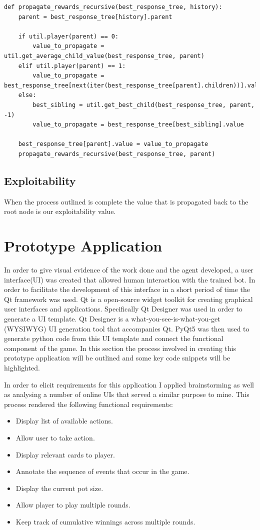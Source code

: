 \begin{lstlisting}[style=Python]
def propagate_rewards_recursive(best_response_tree, history):
    parent = best_response_tree[history].parent

    if util.player(parent) == 0:
        value_to_propagate = util.get_average_child_value(best_response_tree, parent)
    elif util.player(parent) == 1:
        value_to_propagate = best_response_tree[next(iter(best_response_tree[parent].children))].value
    else:
        best_sibling = util.get_best_child(best_response_tree, parent, -1)
        value_to_propagate = best_response_tree[best_sibling].value

    best_response_tree[parent].value = value_to_propagate
    propagate_rewards_recursive(best_response_tree, parent)
\end{lstlisting}

\subsection{Exploitability}\label{subsec:exploitability}
When the process outlined is complete the value that is propagated back to the
root node is our exploitability value.

\section{Prototype Application}\label{sec:prototypeApp}
In order to give visual evidence of the work done and the agent developed, a user interface(UI) was created
that allowed human interaction with the trained bot.
In order to facilitate the development of this interface in a short period of time the Qt framework was used.
Qt is a open-source widget toolkit for creating graphical user interfaces and applications.
Specifically Qt Designer was used in order to generate a UI template.
Qt Designer is a what-you-see-is-what-you-get (WYSIWYG) UI generation tool that accompanies Qt.
PyQt5 was then used to generate python code from this UI template and connect the functional component of the game.
In this section the process involved in creating this prototype application will be outlined
and some key code snippets will be highlighted.

In order to elicit requirements for this application I applied brainstorming as well as analysing a number
of online UIs that served a similar purpose to mine.
This process rendered the following functional requirements:
\begin{itemize}
    \item Display list of available actions.
    \item Allow user to take action.
    \item Display relevant cards to player.
    \item Annotate the sequence of events that occur in the game.
    \item Display the current pot size.
    \item Allow player to play multiple rounds.
    \item Keep track of cumulative winnings across multiple rounds.
\end{itemize}

